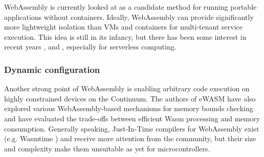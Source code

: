 


WebAssembly is currently looked at as a candidate method for running portable applications without containers. Ideally, WebAssembly can provide significantly more lightweight isolation than VMs and containers for multi-tenant service execution. This idea is still in its infancy, but there has been some interest in recent years \cite{hall2019execution}, \cite{gadepalli2020sledge} and \cite{shillaker2020faasm}, especially for serverless computing.

\subsubsection{Dynamic configuration}

Another strong point of WebAssembly is enabling arbitrary code execution on highly constrained devices on the Continuum. The authors of eWASM \cite{peach2020ewasm} have also explored various WebAssembly-based mechanisms for memory bounds checking and have evaluated the trade-offs between efficient Wasm processing and memory consumption. Generally speaking, Just-In-Time compilers for WebAssembly exist (e.g. Wasmtime \cite{wasmtime}) and receive more attention from the community, but their size and complexity make them unsuitable as yet for microcontrollers.


